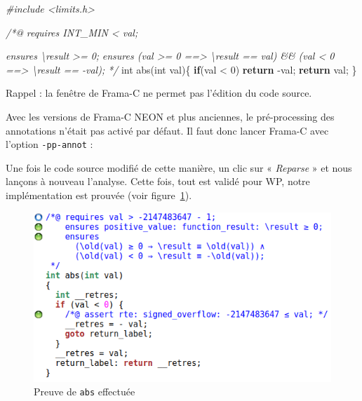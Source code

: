 \documentclass[12pt,francais,]{scrbook}
\newenvironment{Shaded}{}{}
\newcommand{\KeywordTok}[1]{\textcolor[rgb]{0.00,0.44,0.13}{\textbf{{#1}}}}
\newcommand{\DataTypeTok}[1]{\textcolor[rgb]{0.56,0.13,0.00}{{#1}}}
\newcommand{\DecValTok}[1]{\textcolor[rgb]{0.25,0.63,0.44}{{#1}}}
\newcommand{\CommentTok}[1]{\textcolor[rgb]{0.38,0.63,0.69}{\textit{{#1}}}}
\newcommand{\NormalTok}[1]{{#1}}
\newenvironment{zdsalertblock}[1]{%
  \tcolorbox[beamer,%
    noparskip,breakable,
    colback=LightCoral,colframe=DarkRed,%
    colbacklower=Tomato,%
    title=#1]
}{\endtcolorbox}
\newenvironment{zdsblock}[1]{%
  \tcolorbox[beamer,%
    noparskip,breakable,
    colback=LightBlue,colframe=DarkBlue,%
    colbacklower=DarkBlue,%
    title=#1]
}{\endtcolorbox}
\begin{document}
\begin{footnotesize}\begin{Shaded}
\begin{Highlighting}[]
\CommentTok{#include <limits.h>}

\CommentTok{/*@}
\CommentTok{  requires INT_MIN < val;}

\CommentTok{  ensures \textbackslash{}result >= 0;}
\CommentTok{  ensures (val >= 0 ==> \textbackslash{}result == val) && }
\CommentTok{          (val < 0 ==> \textbackslash{}result == -val);}
\CommentTok{*/}
\DataTypeTok{int} \NormalTok{abs(}\DataTypeTok{int} \NormalTok{val)\{}
  \KeywordTok{if}\NormalTok{(val < }\DecValTok{0}\NormalTok{) }\KeywordTok{return} \NormalTok{-val;}
  \KeywordTok{return} \NormalTok{val;}
\NormalTok{\}}
\end{Highlighting}
\end{Shaded}\end{footnotesize}

\begin{zdsalertblock}{Attention}
  Rappel : la fenêtre de Frama-C ne permet pas
  l'édition du code source.
\end{zdsalertblock}

\begin{zdsblock}{Information}
  Avec les versions de Frama-C NEON et plus anciennes, le pré-processing
  des annotations n'était pas activé par défaut. Il faut donc lancer
  Frama-C avec l'option \texttt{-pp-annot} :

  \begin{footnotesize}\begin{Shaded}
  \end{Shaded}\end{footnotesize}
\end{zdsblock}

Une fois le code source modifié de cette manière, un clic sur «
\emph{Reparse} » et nous lançons à nouveau l'analyse. Cette fois, tout
est validé pour WP, notre implémentation est prouvée (voir
figure~\ref{fig:2-1-2-abs-1}).

\begin{figure}[htbp]
\centering
\includegraphics[scale=0.5]{2-1-2-abs-1.png}
\caption{Preuve de \texttt{abs} effectuée}
\label{fig:2-1-2-abs-1}
\end{figure}
\end{document}
